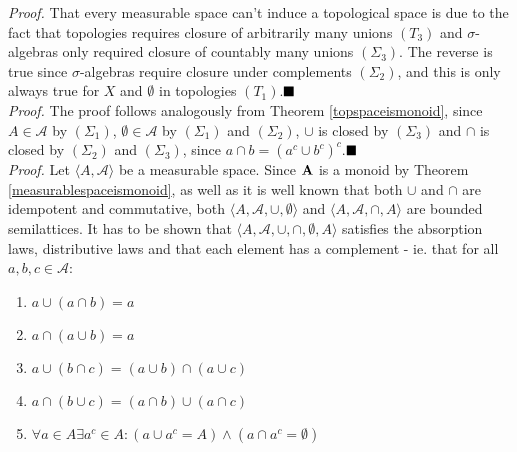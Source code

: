 
\textit{Proof.}
That every measurable space can't induce a topological space is due to the fact that topologies requires closure of arbitrarily many unions $(T_3)$ and $\sigma$-algebras only required closure of countably many unions $(\Sigma_3)$. The reverse is true since $\sigma$-algebras require closure under complements $(\Sigma_2)$, and this is only always true for $X$ and $\emptyset$ in topologies $(T_1)$.$\qed$\\

\textit{Proof.}
The proof follows analogously from Theorem \ref{topspaceismonoid}, since $A\in\mathcal{A}$ by $(\Sigma_1)$, $\emptyset\in\mathcal{A}$ by $(\Sigma_1)$ and $(\Sigma_2)$, $\cup$ is closed by $(\Sigma_3)$ and $\cap$ is closed by $(\Sigma_2)$ and $(\Sigma_3)$, since $a\cap b=(a^c\cup b^c)^c$.$\qed$\\

\textit{Proof.}
Let $\langle A,\mathcal{A}\rangle$ be a measurable space. Since ${\bf A}$ is a monoid by Theorem \ref{measurablespaceismonoid}, as well as it is well known that both $\cup$ and $\cap$ are idempotent and commutative, both $\langle A,\mathcal{A},\cup,\emptyset\rangle$ and $\langle A,\mathcal{A},\cap,A\rangle$ are bounded semilattices. It has to be shown that $\langle A,\mathcal{A},\cup,\cap,\emptyset,A\rangle$ satisfies the absorption laws, distributive laws and that each element has a complement - ie. that for all $a,b,c\in \mathcal{A}$:
\begin{enumerate}
\item $a\cup (a\cap b)=a$
\item $a\cap(a\cup b)=a$
\item $a\cup(b\cap c)=(a\cup b)\cap(a\cup c)$
\item $a\cap(b\cup c)=(a\cap b)\cup(a\cap c)$
\item $\forall a\in A\exists a^c\in A: (a\cup a^c=A)\land (a\cap a^c=\emptyset)$\\
\end{enumerate}

